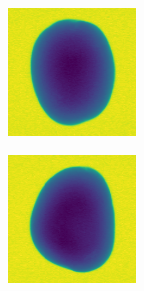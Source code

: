\documentclass[11pt]{article}
\begin{document}
\begin{figure}[!h]
\begin{subfigure}[b]{0.22\textwidth}
         \caption{}
         \label{fig:perfect_29}
     \end{subfigure}
     \hfill
     \begin{subfigure}[b]{0.22\textwidth}
         \centering
         \includegraphics[width=\textwidth]{figurer/potato_dataset/perfect/perfect_30.jpg}
         \caption{}
         \label{fig:perfect_30}
     \end{subfigure}
     \hfill
     \begin{subfigure}[b]{0.22\textwidth}
         \centering
         \includegraphics[width=\textwidth]{figurer/potato_dataset/perfect/perfect_31.jpg}

\end{subfigure}
\end{figure}
\end{document}
